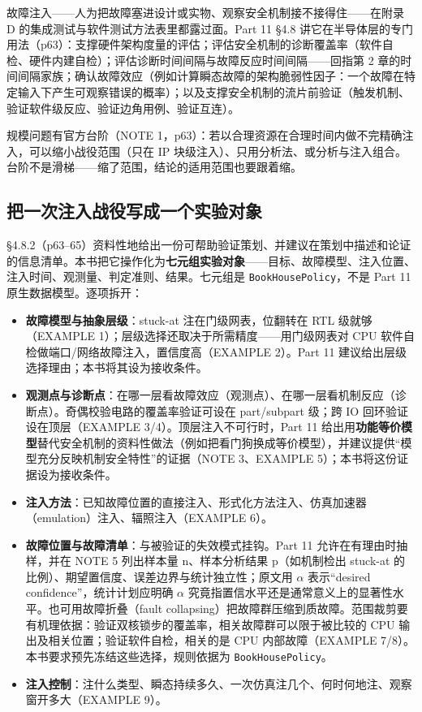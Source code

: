故障注入——人为把故障塞进设计或实物、观察安全机制接不接得住——在附录 D 的集成测试与软件测试方法表里都露过面。Part 11 §4.8 讲它在半导体层的专门用法（p63）：支撑硬件架构度量的评估；评估安全机制的诊断覆盖率（软件自检、硬件内建自检）；评估诊断时间间隔与故障反应时间间隔——回指第 2 章的时间间隔家族；确认故障效应（例如计算瞬态故障的架构脆弱性因子：一个故障在特定输入下产生可观察错误的概率）；以及支撑安全机制的流片前验证（触发机制、验证软件级反应、验证边角用例、验证互连）。

规模问题有官方台阶（NOTE 1，p63）：若以合理资源在合理时间内做不完精确注入，可以缩小战役范围（只在 IP 块级注入）、只用分析法、或分析与注入组合。台阶不是滑梯——缩了范围，结论的适用范围也要跟着缩。

\subsection{把一次注入战役写成一个实验对象}

§4.8.2（p63–65）资料性地给出一份可帮助验证策划、并建议在策划中描述和论证的信息清单。本书把它操作化为\textbf{七元组实验对象}——目标、故障模型、注入位置、注入时间、观测量、判定准则、结果。七元组是 \nolinkurl{BookHousePolicy}，不是 Part 11 原生数据模型。逐项拆开：

\begin{itemize}
\item \textbf{故障模型与抽象层级}：stuck-at 注在门级网表，位翻转在 RTL 级就够（EXAMPLE 1）；层级选择还取决于所需精度——用门级网表对 CPU 软件自检做端口/网络故障注入，置信度高（EXAMPLE 2）。Part 11 建议给出层级选择理由；本书将其设为接收条件。
\item \textbf{观测点与诊断点}：在哪一层看故障效应（观测点）、在哪一层看机制反应（诊断点）。奇偶校验电路的覆盖率验证可设在 part/subpart 级；跨 IO 回环验证设在顶层（EXAMPLE 3/4）。顶层注入不可行时，Part 11 给出用\textbf{功能等价模型}替代安全机制的资料性做法（例如把看门狗换成等价模型），并建议提供“模型充分反映机制安全特性”的证据（NOTE 3、EXAMPLE 5）；本书将这份证据设为接收条件。
\item \textbf{注入方法}：已知故障位置的直接注入、形式化方法注入、仿真加速器（emulation）注入、辐照注入（EXAMPLE 6）。
\item \textbf{故障位置与故障清单}：与被验证的失效模式挂钩。Part 11 允许在有理由时抽样，并在 NOTE 5 列出样本量 n、样本分析结果 p（如机制检出 stuck-at 的比例）、期望置信度、误差边界与统计独立性；原文用 \(\alpha\) 表示“desired confidence”，统计计划应明确 \(\alpha\) 究竟指置信水平还是通常意义上的显著性水平。也可用故障折叠（fault collapsing）把故障群压缩到质故障。范围裁剪要有机理依据：验证双核锁步的覆盖率，相关故障群可以限于被比较的 CPU 输出及相关位置；验证软件自检，相关的是 CPU 内部故障（EXAMPLE 7/8）。本书要求预先冻结这些选择，规则依据为 \nolinkurl{BookHousePolicy}。
\item \textbf{注入控制}：注什么类型、瞬态持续多久、一次仿真注几个、何时何地注、观察窗开多大（EXAMPLE 9）。
\end{itemize}

